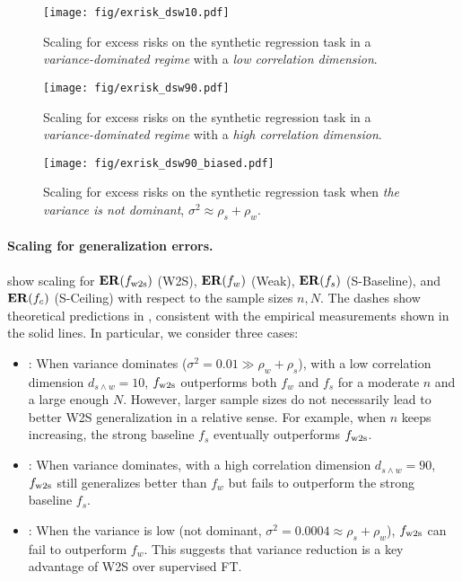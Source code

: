 \begin{figure}[!ht]
    \centering
    \texttt{[image: fig/exrisk\_dsw10.pdf]}%
    \caption{Scaling for excess risks on the synthetic regression task in a \emph{variance-dominated regime} with a \emph{low correlation dimension}.}\label{fig:exrisk_dsw10}
\end{figure}

\begin{figure}[!ht]
    \centering
    \texttt{[image: fig/exrisk\_dsw90.pdf]}%
    \caption{Scaling for excess risks on the synthetic regression task in a \emph{variance-dominated regime} with a \emph{high correlation dimension}.}\label{fig:exrisk_dsw90}
\end{figure}

\begin{figure}[!ht]
    \centering
    \texttt{[image: fig/exrisk\_dsw90\_biased.pdf]}%
    \caption{Scaling for excess risks on the synthetic regression task when \emph{the variance is not dominant}, $\sigma^2 \approx \rho_s + \rho_w$.}\label{fig:exrisk_dsw90_biased}
\end{figure}

\paragraph{Scaling for generalization errors.}
 show scaling for $\mathbf{ER}(f_{\mathrm{w2s}})$ (W2S), $\mathbf{ER}(f_w)$ (Weak), $\mathbf{ER}(f_s)$ (S-Baseline), and $\mathbf{ER}(f_c)$ (S-Ceiling) with respect to the sample sizes $n, N$. The dashes show theoretical predictions in , consistent with the empirical measurements shown in the solid lines.
In particular, we consider three cases:
\begin{itemize}%
    \item {}: When variance dominates ($\sigma^2 = 0.01 \gg \rho_w + \rho_s$), with a low correlation dimension $d_{s \wedge w} = 10$, $f_{\mathrm{w2s}}$ outperforms both $f_w$ and $f_s$ for a moderate $n$ and a large enough $N$. However, larger sample sizes do not necessarily lead to better W2S generalization in a relative sense. For example, when $n$ keeps increasing, the strong baseline $f_s$ eventually outperforms $f_{\mathrm{w2s}}$.
    \item {}: When variance dominates, with a high correlation dimension $d_{s \wedge w} = 90$, $f_{\mathrm{w2s}}$ still generalizes better than $f_w$ but fails to outperform the strong baseline $f_s$. 
    \item {}: When the variance is low (not dominant, \eg $\sigma^2 = 0.0004 \approx \rho_s + \rho_w$), $f_{\mathrm{w2s}}$ can fail to outperform $f_w$. This suggests that variance reduction is a key advantage of W2S over supervised FT.
\end{itemize}



